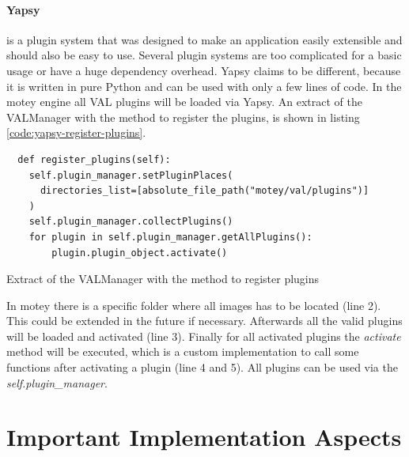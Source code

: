 \paragraph{Yapsy} is a plugin system that was designed to make an application easily extensible and should also be easy to use.
Several plugin systems are too complicated for a basic usage or have a huge dependency overhead.
Yapsy claims to be different, because it is written in pure Python and can be used with only a few lines of code.
In the motey engine all \ac{VAL} plugins will be loaded via Yapsy.
An extract of the VALManager with the method to register the plugins, is shown in listing \ref{code:yapsy-register-plugins}.
\begin{listing}[H]
  \begin{verbatim}
  def register_plugins(self):
    self.plugin_manager.setPluginPlaces(
      directories_list=[absolute_file_path("motey/val/plugins")]
    )
    self.plugin_manager.collectPlugins()
    for plugin in self.plugin_manager.getAllPlugins():
        plugin.plugin_object.activate()
  \end{verbatim}
  \caption{Extract of the VALManager with the method to register plugins}
  \label{code:yapsy-register-plugins}
\end{listing}
In motey there is a specific folder where all images has to be located (line 2).
This could be extended in the future if necessary.
Afterwards all the valid plugins will be loaded and activated (line 3).
Finally for all activated plugins the \textit{activate} method will be executed, which is a custom implementation to call some functions after activating a plugin (line 4 and 5).
All plugins can be used via the \textit{self.plugin\_manager}.

\section{Important Implementation Aspects}


\doit

